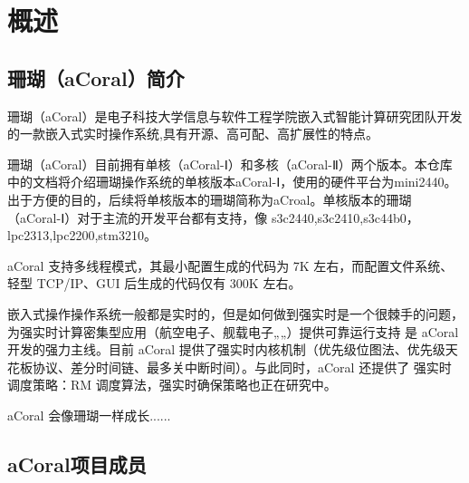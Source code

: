 \chapter{概述}

\section{珊瑚（aCoral）简介}

珊瑚（aCoral）是电子科技大学信息与软件工程学院嵌入式智能计算研究团队开发的一款嵌入式实时操作系统,具有开源、高可配、高扩展性的特点。

珊瑚（aCoral）目前拥有单核（aCoral-Ⅰ）和多核（aCoral-Ⅱ）两个版本。本仓库中的文档将介绍珊瑚操作系统的单核版本aCoral-Ⅰ，使用的硬件平台为mini2440。
出于方便的目的，后续将单核版本的珊瑚简称为aCroal。单核版本的珊瑚（aCoral-Ⅰ）对于主流的开发平台都有支持，像 s3c2440,s3c2410,s3c44b0，lpc2313,lpc2200,stm3210。

aCoral 支持多线程模式，其最小配置生成的代码为 7K 左右，而配置文件系统、轻型 TCP/IP、GUI 后生成的代码仅有 300K 左右。

嵌入式操作操作系统一般都是实时的，但是如何做到强实时是一个很棘手的问题，为强实时计算密集型应用（航空电子、舰载电子„„）提供可靠运行支持
是 aCoral 开发的强力主线。目前 aCoral 提供了强实时内核机制（优先级位图法、优先级天花板协议、差分时间链、最多关中断时间）。与此同时，aCoral 还提供了
强实时调度策略：RM 调度算法，强实时确保策略也正在研究中。

aCoral 会像珊瑚一样成长......

\section{aCoral项目成员}
